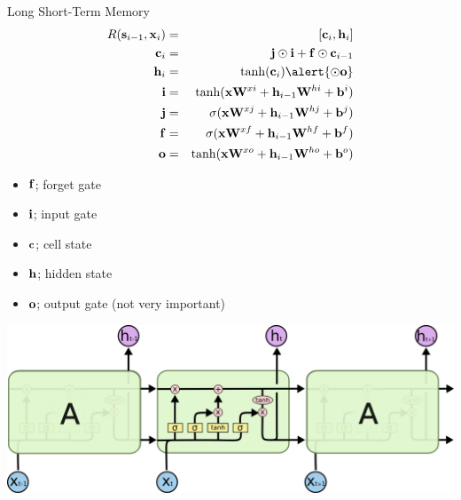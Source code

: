 \documentclass{beamer}
\begin{document}
\begin{frame}{Long Short-Term Memory}
    \begin{eqnarray*}
      R(\bold \bolds_{i-1}, \boldx_i) &=& [\boldc_i, \boldh_i]  \\
      \boldc_i &=& \boldj \odot \boldi  + \bold f \odot \bold c_{i-1}    \\
      \boldh_i &=& \tanh(\boldc_i) \alert{\odot \boldo}\\ 
      \boldi &=& \tanh(\boldx \boldW^{xi} + \boldh_{i-1}\boldW^{hi} + \boldb^i) \\
      \boldj &=& \sigma(\boldx \boldW^{xj} + \boldh_{i-1}\boldW^{hj} + \boldb^j) \\
      \boldf &=& \sigma(\boldx \boldW^{xf} + \boldh_{i-1}\boldW^{hf} + \boldb^f) \\
      \boldo &=& \tanh(\boldx \boldW^{xo} + \boldh_{i-1}\boldW^{ho} + \boldb^o) \\
    \end{eqnarray*}
    \begin{itemize}
    \item $\mathbf{f}$; forget gate
    \item $\mathbf{i}$; input gate
    \item $\mathbf{c}$; cell state
    \item $\mathbf{h}$; hidden state
    \item $\mathbf{o}$; output gate (not very important)
    \end{itemize}
\end{frame}

\begin{frame}
  \begin{center}
    \includegraphics[width=\textwidth]{LSTM3-chain}
  \end{center}

\end{frame}
\end{document}
